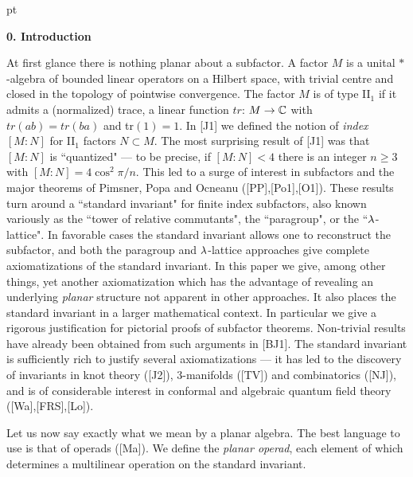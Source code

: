 \begin{abstract}
We introduce a notion of planar
algebra, the simplest example of which is a vector
space of tensors, closed under planar
contractions. A planar algebra with suitable
positivity properties produces a finite index
subfactor of a II${}_1$ factor, and vice versa.
\end{abstract}

 pt

\noindent
{\large\bf 0. Introduction}

\medskip At first glance there is nothing planar
about a subfactor. A factor $M$ is a unital
$*$-algebra of bounded linear operators on a
Hilbert space, with trivial centre and closed in
the topology of pointwise convergence. The factor
$M$ is of type II${}_1$ if it admits a
(normalized) trace, a linear function $tr$:
$M\to\Bbb C$ with $tr(ab)=tr(ba)$ and
tr$(1)=1$. In [J1] we defined the notion of {\it
index} $[M:N]$ for II${}_1$ factors $N\subset M$.
The most surprising result of [J1] was that
$[M:N]$ is ``quantized" --- to be precise, if
$[M:N] <4$ there is an integer $n\geq 3$ with
$[M:N]=4\cos^2\pi/n$. This led to a surge of
interest in subfactors and the major theorems of
Pimsner, Popa and Ocneanu ([PP],[Po1],[O1]). These
results turn around a ``standard invariant" for
finite index subfactors, also known variously as
the ``tower of relative commutants", the
``paragroup", or the ``$\lambda$-lattice". In favorable
cases the standard invariant allows one to
reconstruct the subfactor, and both the paragroup
and $\lambda$-lattice approaches give complete
axiomatizations of the standard invariant. In this
paper we give, among other things, yet another
axiomatization which has the advantage of
revealing an underlying {\it planar} structure not
apparent in other approaches.  It also places the standard
invariant in a larger mathematical context. In
particular we give a rigorous justification for
pictorial proofs of subfactor theorems.
Non-trivial results have already been obtained
from such arguments in [BJ1]. The standard
invariant is sufficiently rich to justify several
axiomatizations --- it has led to the discovery of
invariants in knot theory ([J2]), 3-manifolds
([TV]) and combinatorics ([NJ]), and is of
considerable interest in conformal and algebraic
quantum field theory ([Wa],[FRS],[Lo]).

Let us now say exactly what we mean by a planar
algebra. The best language to use is that of
operads ([Ma]). We define the {\it planar operad},
each element of which determines a multilinear
operation on the standard invariant.

